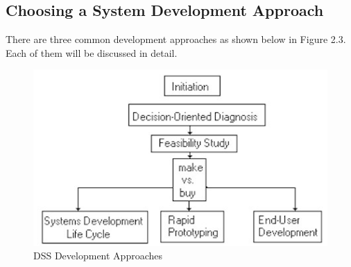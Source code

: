 \subsection{Choosing a System Development Approach}
There are three common development approaches as shown below in Figure 2.3. Each of them will be discussed in detail.
\begin{figure}[H]
\centering
\includegraphics[scale=0.7]{Images/DSSDevelopmentApproaches.png}
\caption[DSS Development Approaches]{DSS Development Approaches \cite{DDSTypes}}
\end{figure}
